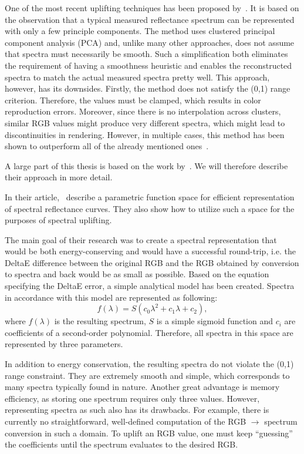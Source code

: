 One of the most recent uplifting techniques has been proposed by~\citet{upsamplingOtsu}. It is based on the observation that a typical measured reflectance spectrum can be represented with only a few principle components. The method uses clustered principal component analysis (PCA) and, unlike many other approaches, does not assume that spectra must necessarily be smooth. Such a simplification both eliminates the requirement of having a smoothness heuristic and enables the reconstructed spectra to match the actual measured spectra pretty well. This approach, however, has its downsides. Firstly, the method does not satisfy the (0,1) range criterion. Therefore, the values must be clamped, which results in color reproduction errors. Moreover, since there is no interpolation across clusters, similar RGB values might produce very different spectra, which might lead to discontinuities in rendering. However, in multiple cases, this method has been shown to outperform all of the already mentioned ones~\cite{upsamplingJakobHanika}.

A large part of this thesis is based on the work by~\citet{upsamplingJakobHanika}. We will therefore describe their approach in more detail.

In their article,~\citet{upsamplingJakobHanika} describe a parametric function space for efficient representation of spectral reflectance curves. They also show how to utilize such a space for the purposes of spectral uplifting.

The main goal of their research was to create a spectral representation that would be both energy-conserving and would have a successful round-trip, i.e. the DeltaE difference between the original RGB and the RGB obtained by conversion to spectra and back would be as small as possible. Based on the equation specifying the DeltaE error, a simple analytical model has been created. Spectra in accordance with this model are represented as following:
\begin{equation} \label{sigmoidRepresentation}
f(\lambda)=S(c_{0}\lambda^2+c_{1}\lambda+c_{2}),
\end{equation}
where $f(\lambda)$ is the resulting spectrum, $S$ is a simple sigmoid function and $c_{i}$ are coefficients of a second-order polynomial. Therefore, all spectra in this space are represented by three parameters.

In addition to energy conservation, the resulting spectra do not violate the (0,1) range constraint. They are extremely smooth and simple, which corresponds to many spectra typically found in nature. Another great advantage is memory efficiency, as storing one spectrum requires only three values. However, representing spectra as such also has its drawbacks. For example, there is currently no straightforward, well-defined computation of the RGB $\to$ spectrum conversion in such a domain. To uplift an RGB value, one must keep ``guessing'' the coefficients until the spectrum evaluates to the desired RGB.

